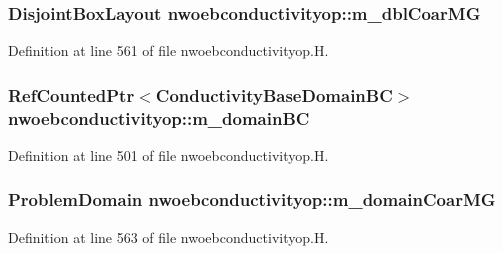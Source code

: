 \subsubsection[{\texorpdfstring{m\+\_\+dbl\+Coar\+MG}{m_dblCoarMG}}]{\setlength{\rightskip}{0pt plus 5cm}Disjoint\+Box\+Layout nwoebconductivityop\+::m\+\_\+dbl\+Coar\+MG\hspace{0.3cm}{\ttfamily [protected]}}\hypertarget{classnwoebconductivityop_a04ba4328dc72d0784f8ffaaa62a6aaf3}{}\label{classnwoebconductivityop_a04ba4328dc72d0784f8ffaaa62a6aaf3}


Definition at line 561 of file nwoebconductivityop.\+H.

\subsubsection[{\texorpdfstring{m\+\_\+domain\+BC}{m_domainBC}}]{\setlength{\rightskip}{0pt plus 5cm}Ref\+Counted\+Ptr$<$Conductivity\+Base\+Domain\+BC$>$ nwoebconductivityop\+::m\+\_\+domain\+BC\hspace{0.3cm}{\ttfamily [protected]}}\hypertarget{classnwoebconductivityop_aac893509676898f0821bc685f6ff03af}{}\label{classnwoebconductivityop_aac893509676898f0821bc685f6ff03af}


Definition at line 501 of file nwoebconductivityop.\+H.

\subsubsection[{\texorpdfstring{m\+\_\+domain\+Coar\+MG}{m_domainCoarMG}}]{\setlength{\rightskip}{0pt plus 5cm}Problem\+Domain nwoebconductivityop\+::m\+\_\+domain\+Coar\+MG\hspace{0.3cm}{\ttfamily [protected]}}\hypertarget{classnwoebconductivityop_af2669ce6311ac2d2d2a6ad732b9175d2}{}\label{classnwoebconductivityop_af2669ce6311ac2d2d2a6ad732b9175d2}


Definition at line 563 of file nwoebconductivityop.\+H.

